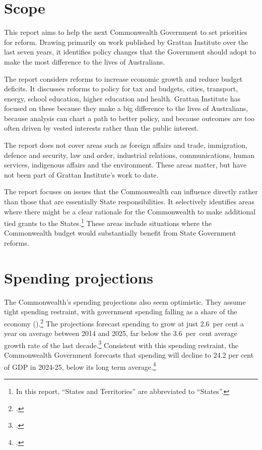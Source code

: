 \documentclass{grattanAlpha}
\begin{document}
\section{Scope}
This report aims to help the next Commonwealth Government to
set priorities for reform. Drawing primarily on work published by
Grattan Institute over the last seven years, it identifies policy
changes that the Government should adopt to make the most
difference to the lives of Australians.

The report considers reforms to increase economic growth and
reduce budget deficits. It discusses reforms to policy for tax and
budgets, cities, transport, energy, school education, higher
education and health. Grattan Institute has focused on these
because they make a big difference to the lives of Australians,
because analysis can chart a path to better policy, and because
outcomes are too often driven by vested interests rather than the
public interest.

The report does not cover areas such as foreign affairs and trade,
immigration, defence and security, law and order, industrial
relations, communications, human services, indigenous affairs
and the environment. These areas matter, but have not been part
of Grattan Institute’s work to date.

The report focuses on issues that the Commonwealth can
influence directly rather than those that are essentially State
responsibilities. It selectively identifies areas where there might be
a clear rationale for the Commonwealth to make additional tied
grants to the States.\footnote{In this report, “States and Territories” are abbreviated to “States”.} 
These areas include situations where the Commonwealth budget would substantially benefit from State
Government reforms.


\section{Spending projections}
The Commonwealth’s spending projections also seem optimistic. They assume tight spending restraint, with government spending falling as a share of the economy ().\footcite[][5--11]{Treasury2015BudgetPapers201516}  The projections forecast spending to grow at just 2.6~per cent a year on average between 2014 and 2025, far below the 3.6~per~cent average growth rate of the last decade.\footcite[][5]{PBO2015}  Consistent with this spending restraint, the Commonwealth Government forecasts that spending will decline to 24.2 per cent of GDP in 2024-25, below its long term average.\footcite[][3--9]{Treasury2015BudgetPapers201516}  
\end{document}
